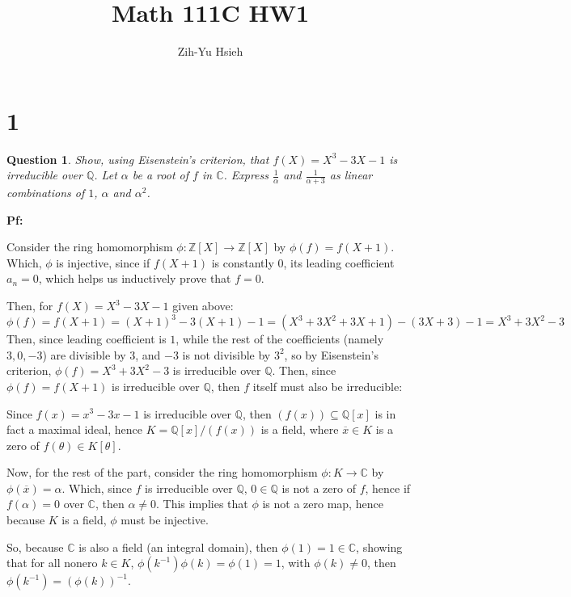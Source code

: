 \documentclass{article}
\title{Math 111C HW1}
\author{Zih-Yu Hsieh}
\newtheorem{question}{Question}
\begin{document}
\maketitle

\section*{1}
\begin{myBox}[]{}
    \begin{question}
        Show, using Eisenstein's criterion, that $f(X)=X^3-3X-1$ is irreducible over $\mathbb{Q}$. Let $\alpha$ be a root of $f$ in $\mathbb{C}$. 
        Express $\frac{1}{\alpha}$ and $\frac{1}{\alpha+3}$ as linear combinations of $1$, $\alpha$ and $\alpha^2$.
    \end{question}
\end{myBox}

\textbf{Pf:}

Consider the ring homomorphism $\phi:\mathbb{Z}[X]\rightarrow \mathbb{Z}[X]$ by $\phi(f)=f(X+1)$. Which, $\phi$ is injective, since if $f(X+1)$ is constantly $0$, 
its leading coefficient $a_n=0$, which helps us inductively prove that $f=0$.

Then, for $f(X)=X^3-3X-1$ given above:
$$\phi(f)=f(X+1)=(X+1)^3-3(X+1)-1 = (X^3+3X^2+3X+1)-(3X+3)-1 = X^3+3X^2-3$$
Then, since leading coefficient is $1$, while the rest of the coefficients (namely $3,0,-3$) are divisible by $3$, and $-3$ is not divisible by $3^2$,
so by Eisenstein's criterion, $\phi(f)=X^3+3X^2-3$ is irreducible over $\mathbb{Q}$. Then, since $\phi(f)=f(X+1)$ is irreducible over $\mathbb{Q}$, then $f$ itself must also be irreducible:

Since $f(x)=x^3-3x-1$ is irreducible over $\mathbb{Q}$, then $(f(x))\subseteq\mathbb{Q}[x]$ is in fact a maximal ideal, hence $K=\mathbb{Q}[x]/(f(x))$ is a field, where $\overline{x}\in K$ is a zero of 
$f(\theta)\in K[\theta]$.

\hfil

Now, for the rest of the part, consider the ring homomorphism $\phi:K\rightarrow \mathbb{C}$ by $\phi(\overline{x})=\alpha$. Which, since $f$ is irreducible over $\mathbb{Q}$, $0\in\mathbb{Q}$ is not a zero of $f$,
hence if $f(\alpha)=0$ over $\mathbb{C}$, then $\alpha\neq 0$. This implies that $\phi$ is not a zero map, hence because $K$ is a field, $\phi$ must be injective.

So, because $\mathbb{C}$ is also a field (an integral domain), then $\phi(1)=1\in\mathbb{C}$, showing that for all nonero $k\in K$, $\phi(k^{-1})\phi(k)=\phi(1)=1$, with $\phi(k)\neq 0$, then $\phi(k^{-1})=(\phi(k))^{-1}$.
\end{document}
